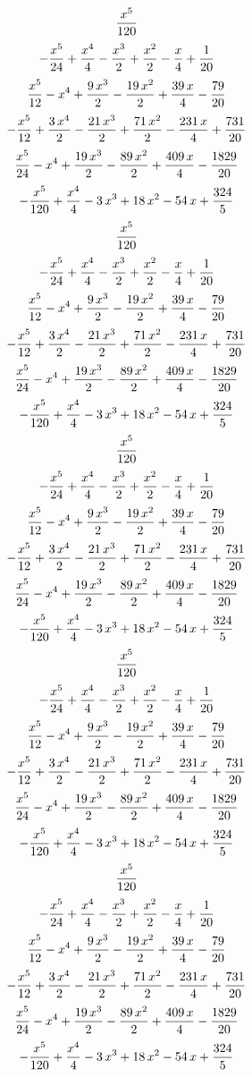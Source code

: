 $${{x^5}\over{120}}$$
$$-{{x^5}\over{24}}+{{x^4}\over{4}}-{{x^3}\over{2}}+{{x^2}\over{2}}-
 {{x}\over{4}}+{{1}\over{20}}$$
$${{x^5}\over{12}}-x^4+{{9\,x^3}\over{2}}-{{19\,x^2}\over{2}}+{{39\,x
 }\over{4}}-{{79}\over{20}}$$
$$-{{x^5}\over{12}}+{{3\,x^4}\over{2}}-{{21\,x^3}\over{2}}+{{71\,x^2
 }\over{2}}-{{231\,x}\over{4}}+{{731}\over{20}}$$
$${{x^5}\over{24}}-x^4+{{19\,x^3}\over{2}}-{{89\,x^2}\over{2}}+{{409
 \,x}\over{4}}-{{1829}\over{20}}$$
$$-{{x^5}\over{120}}+{{x^4}\over{4}}-3\,x^3+18\,x^2-54\,x+{{324
 }\over{5}}$$
$${{x^5}\over{120}}$$
$$-{{x^5}\over{24}}+{{x^4}\over{4}}-{{x^3}\over{2}}+{{x^2}\over{2}}-
 {{x}\over{4}}+{{1}\over{20}}$$
$${{x^5}\over{12}}-x^4+{{9\,x^3}\over{2}}-{{19\,x^2}\over{2}}+{{39\,x
 }\over{4}}-{{79}\over{20}}$$
$$-{{x^5}\over{12}}+{{3\,x^4}\over{2}}-{{21\,x^3}\over{2}}+{{71\,x^2
 }\over{2}}-{{231\,x}\over{4}}+{{731}\over{20}}$$
$${{x^5}\over{24}}-x^4+{{19\,x^3}\over{2}}-{{89\,x^2}\over{2}}+{{409
 \,x}\over{4}}-{{1829}\over{20}}$$
$$-{{x^5}\over{120}}+{{x^4}\over{4}}-3\,x^3+18\,x^2-54\,x+{{324
 }\over{5}}$$
$${{x^5}\over{120}}$$
$$-{{x^5}\over{24}}+{{x^4}\over{4}}-{{x^3}\over{2}}+{{x^2}\over{2}}-
 {{x}\over{4}}+{{1}\over{20}}$$
$${{x^5}\over{12}}-x^4+{{9\,x^3}\over{2}}-{{19\,x^2}\over{2}}+{{39\,x
 }\over{4}}-{{79}\over{20}}$$
$$-{{x^5}\over{12}}+{{3\,x^4}\over{2}}-{{21\,x^3}\over{2}}+{{71\,x^2
 }\over{2}}-{{231\,x}\over{4}}+{{731}\over{20}}$$
$${{x^5}\over{24}}-x^4+{{19\,x^3}\over{2}}-{{89\,x^2}\over{2}}+{{409
 \,x}\over{4}}-{{1829}\over{20}}$$
$$-{{x^5}\over{120}}+{{x^4}\over{4}}-3\,x^3+18\,x^2-54\,x+{{324
 }\over{5}}$$
$${{x^5}\over{120}}$$
$$-{{x^5}\over{24}}+{{x^4}\over{4}}-{{x^3}\over{2}}+{{x^2}\over{2}}-
 {{x}\over{4}}+{{1}\over{20}}$$
$${{x^5}\over{12}}-x^4+{{9\,x^3}\over{2}}-{{19\,x^2}\over{2}}+{{39\,x
 }\over{4}}-{{79}\over{20}}$$
$$-{{x^5}\over{12}}+{{3\,x^4}\over{2}}-{{21\,x^3}\over{2}}+{{71\,x^2
 }\over{2}}-{{231\,x}\over{4}}+{{731}\over{20}}$$
$${{x^5}\over{24}}-x^4+{{19\,x^3}\over{2}}-{{89\,x^2}\over{2}}+{{409
 \,x}\over{4}}-{{1829}\over{20}}$$
$$-{{x^5}\over{120}}+{{x^4}\over{4}}-3\,x^3+18\,x^2-54\,x+{{324
 }\over{5}}$$
$${{x^5}\over{120}}$$
$$-{{x^5}\over{24}}+{{x^4}\over{4}}-{{x^3}\over{2}}+{{x^2}\over{2}}-
 {{x}\over{4}}+{{1}\over{20}}$$
$${{x^5}\over{12}}-x^4+{{9\,x^3}\over{2}}-{{19\,x^2}\over{2}}+{{39\,x
 }\over{4}}-{{79}\over{20}}$$
$$-{{x^5}\over{12}}+{{3\,x^4}\over{2}}-{{21\,x^3}\over{2}}+{{71\,x^2
 }\over{2}}-{{231\,x}\over{4}}+{{731}\over{20}}$$
$${{x^5}\over{24}}-x^4+{{19\,x^3}\over{2}}-{{89\,x^2}\over{2}}+{{409
 \,x}\over{4}}-{{1829}\over{20}}$$
$$-{{x^5}\over{120}}+{{x^4}\over{4}}-3\,x^3+18\,x^2-54\,x+{{324
 }\over{5}}$$
